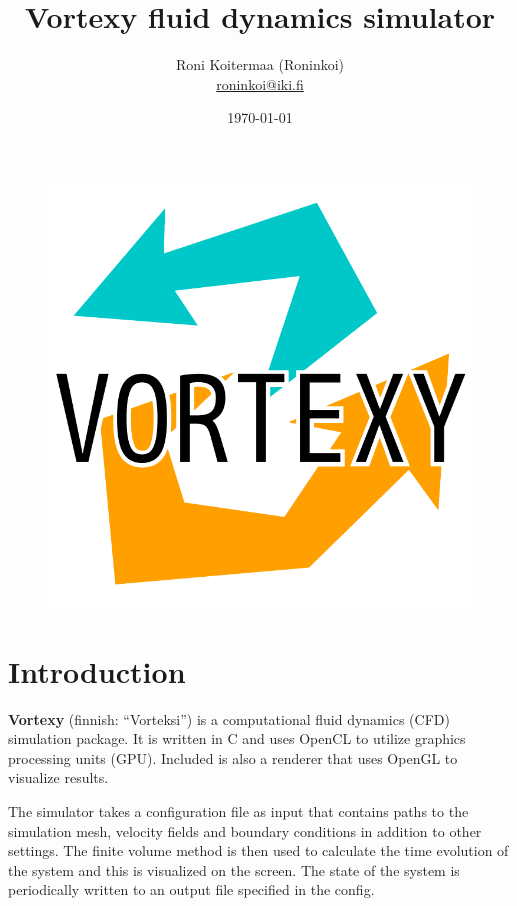 \documentclass[12pt]{article}
\title {
  Vortexy fluid dynamics simulator
}
\date{\today}
\author {
  Roni Koitermaa (Roninkoi) \\
  \href{mailto:roninkoi@iki.fi}{roninkoi@iki.fi}
}
\begin{document}
\setlength{\belowcaptionskip}{10pt}


\normalsize

\maketitle

\begin{figure}[!h]
  \centering
  \centering
  \includegraphics[width=0.7\linewidth]{gfx/vortexylogo.pdf}
\end{figure}

\newpage

\tableofcontents

\newpage

\section{Introduction}

{\bf Vortexy} (finnish: ``Vorteksi'') is a computational fluid dynamics (CFD) simulation package. It is written in C and uses OpenCL to utilize graphics processing units (GPU). Included is also a renderer that uses OpenGL to visualize results.

The simulator takes a configuration file as input that contains paths to the simulation mesh, velocity fields and boundary conditions in addition to other settings. The finite volume method is then used to calculate the time evolution of the system and this is visualized on the screen. The state of the system is periodically written to an output file specified in the config.
\end{document}
